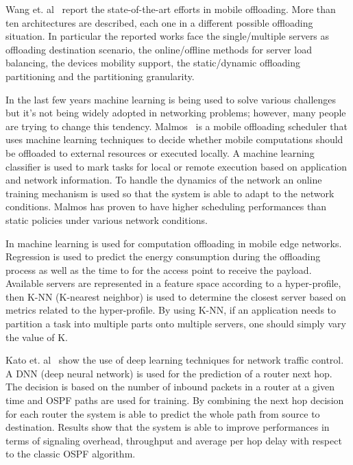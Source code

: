 Wang et. al~\cite{edge_cloud_offloading_undersubmission:} report the state-of-the-art efforts in mobile offloading. More than ten architectures are described, each one in a different possible offloading situation. In particular the reported works face the single/multiple servers as offloading destination scenario, the online/offline methods for server load balancing, the devices mobility support, the static/dynamic offloading partitioning and the partitioning granularity.

In the last few years machine learning is being used to solve various challenges but it's not being widely adopted in networking problems; however, many people are trying to change this tendency. Malmos~\cite{malmos} is a mobile offloading scheduler that uses machine learning techniques to decide whether mobile computations should be offloaded to external resources or executed locally. A machine learning classifier is used to mark tasks for local or remote execution based on application and network information. To handle the dynamics of the network an online training mechanism is used so that the system is able to adapt to the network conditions. Malmos has proven to have higher scheduling performances than static policies under various network conditions.

In \cite{hyperprofile_undersubmission:} machine learning is used for computation offloading in mobile edge networks. Regression is used to predict the energy consumption during the offloading process as well as the time to for the access point to receive the payload. Available servers are represented in a feature space according to a hyper-profile, then K-NN (K-nearest neighbor) is used to determine the closest server based on metrics related to the hyper-profile. By using K-NN, if an application needs to partition a task into multiple parts onto multiple servers, one should simply vary the value of K. 

Kato et. al~\cite{deep_learning_heterogeneus} show the use of deep learning techniques for network traffic control. A DNN (deep neural network) is used for the prediction of a router next hop. The decision is based on the number of inbound packets in a router at a given time and OSPF paths are used for training. By combining the next hop decision for each router the system is able to predict the whole path from source to destination. Results show that the system is able to improve performances in terms of signaling overhead, throughput and average per hop delay with respect to the classic OSPF algorithm.

